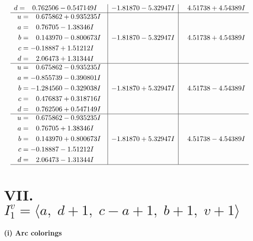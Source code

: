 \documentclass[1p]{elsarticle_modified}
\theoremstyle{definition}
\begin{document}
$$\begin{array}{c|c|c}
\begin{aligned}
d &= \phantom{-}0.762506 - 0.547149 I\end{aligned}
 & -1.81870 - 5.32947 I & \phantom{-}4.51738 + 4.54389 I \\ \hline\begin{aligned}
u &= \phantom{-}0.675862 + 0.935235 I \\
a &= \phantom{-}0.76705 - 1.38346 I \\
b &= \phantom{-}0.143970 - 0.800673 I \\
c &= -0.18887 + 1.51212 I \\
d &= \phantom{-}2.06473 + 1.31344 I\end{aligned}
 & -1.81870 - 5.32947 I & \phantom{-}4.51738 + 4.54389 I \\ \hline\begin{aligned}
u &= \phantom{-}0.675862 - 0.935235 I \\
a &= -0.855739 - 0.390801 I \\
b &= -1.284560 - 0.329038 I \\
c &= \phantom{-}0.476837 + 0.318716 I \\
d &= \phantom{-}0.762506 + 0.547149 I\end{aligned}
 & -1.81870 + 5.32947 I & \phantom{-}4.51738 - 4.54389 I \\ \hline\begin{aligned}
u &= \phantom{-}0.675862 - 0.935235 I \\
a &= \phantom{-}0.76705 + 1.38346 I \\
b &= \phantom{-}0.143970 + 0.800673 I \\
c &= -0.18887 - 1.51212 I \\
d &= \phantom{-}2.06473 - 1.31344 I\end{aligned}
 & -1.81870 + 5.32947 I & \phantom{-}4.51738 - 4.54389 I\\
 \hline 
 \end{array}$$\newpage\newpage\renewcommand{\arraystretch}{1}
\centering \section*{VII. $I^v_{1}= \langle a,\;d+1,\;c- a+1,\;b+1,\;v+1 \rangle$}
\flushleft \textbf{(i) Arc colorings}\\
\end{document}
